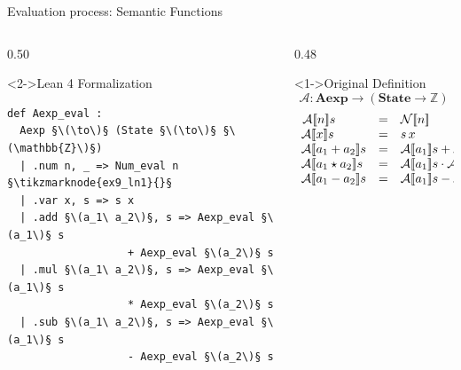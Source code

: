 \documentclass[xcolor={dvipsnames,table}]{beamer}
\begin{document}
\begin{frame}[fragile]{Evaluation process: \alert{Semantic Functions}}

    \begin{columns}[T]
        
        \begin{column}{0.50\textwidth}
            \begin{block}<2->{Lean 4 Formalization}
                \begin{lstlisting}[style=lean4, basicstyle=\scriptsize\ttfamily]
def Aexp_eval :
  Aexp §\(\to\)§ (State §\(\to\)§ §\(\mathbb{Z}\)§)
  | .num n, _ => Num_eval n §\tikzmarknode{ex9_ln1}{}§
  | .var x, s => s x
  | .add §\(a_1\ a_2\)§, s => Aexp_eval §\(a_1\)§ s
                   + Aexp_eval §\(a_2\)§ s
  | .mul §\(a_1\ a_2\)§, s => Aexp_eval §\(a_1\)§ s 
                   * Aexp_eval §\(a_2\)§ s
  | .sub §\(a_1\ a_2\)§, s => Aexp_eval §\(a_1\)§ s
                   - Aexp_eval §\(a_2\)§ s
                \end{lstlisting}
            \end{block}
        \end{column}

        \begin{column}{0.48\textwidth}
            \begin{block}<1->{Original Definition}
\scriptsize
\[
\mathcal{A}: \mathbf{Aexp} \to (\mathbf{State} \to \mathbb{Z})
\]
\[
\begin{array}{lcl}
        \tikztarget{ex9_txt1}{}\mathcal{A}[\![n]\!]s &=& \mathcal{N}[\![n]\!] \\
        \mathcal{A}[\![x]\!]s &=& s \, x \\
        \mathcal{A}[\![a_1 + a_2]\!]s &=& \mathcal{A}[\![a_1]\!]s + \mathcal{A}[\![a_2]\!]s \\
        \mathcal{A}[\![a_1 \star a_2]\!]s &=& \mathcal{A}[\![a_1]\!]s \cdot \mathcal{A}[\![a_2]\!]s \\
        \mathcal{A}[\![a_1 - a_2]\!]s &=& \mathcal{A}[\![a_1]\!]s - \mathcal{A}[\![a_2]\!]s
\end{array}
\]
            \end{block}
        \end{column}
        
    \end{columns}

\end{frame}
\end{document}
